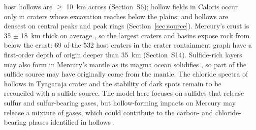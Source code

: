 \documentclass[article,review]{planetary}
\begin{document}
host hollows are $\geq$ 10~km across (Section~S6); hollow fields in Caloris occur only in craters whose excavation reaches below the plains; and hollows are densest on central peaks and peak rings (Section~\ref{sec:source}). Mercury's crust is 35 $\pm$ 18~km thick on average \parencite{padovan2015}, so the largest craters and basins expose rock from below the crust: 69 of the 532 host craters in the crater containment graph have a first-order depth of origin deeper than 35~km (Section~S14). Sulfide-rich layers may also form in Mercury's mantle as its magma ocean solidifies \parencite{boukare2019}, so part of the sulfide source may have originally come from the mantle. The chloride spectra of hollows in Tyagaraja crater \parencite{lucchetti2021} and the stability of dark spots \parencite{wang2022} remain to be reconciled with a sulfide source. The model here focuses on sulfides that release sulfur and sulfur-bearing gases, but hollow-forming impacts on Mercury may release a mixture of gases, which could contribute to the carbon- and chloride-bearing phases identified in hollows \parencite{emran2025,lucchetti2021}.
\end{document}
